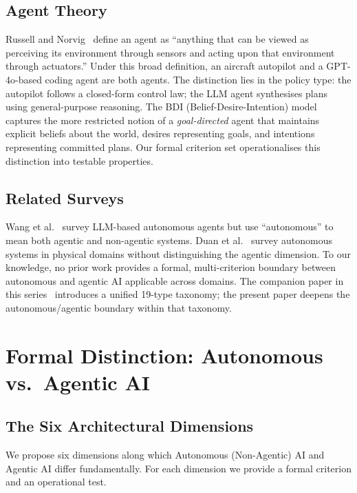 \documentclass[12pt, a4paper]{article}
\begin{document}
\subsection{Agent Theory}
Russell and Norvig~\citep{russell2021artificial} define an agent as ``anything that can be viewed as perceiving its environment through sensors and acting upon that environment through actuators.'' Under this broad definition, an aircraft autopilot and a GPT-4o-based coding agent are both agents. The distinction lies in the policy type: the autopilot follows a closed-form control law; the LLM agent synthesises plans using general-purpose reasoning. The BDI (Belief-Desire-Intention) model~\citep{rao1995bdi} captures the more restricted notion of a \emph{goal-directed} agent that maintains explicit beliefs about the world, desires representing goals, and intentions representing committed plans. Our formal criterion set operationalises this distinction into testable properties.

\subsection{Related Surveys}
Wang et al.~\citep{wang2024survey} survey LLM-based autonomous agents but use ``autonomous'' to mean both agentic and non-agentic systems. Duan et al.~\citep{duan2022survey} survey autonomous systems in physical domains without distinguishing the agentic dimension. To our knowledge, no prior work provides a formal, multi-criterion boundary between autonomous and agentic AI applicable across domains. The companion paper in this series~\citep{mahdi2026taxonomy} introduces a unified 19-type taxonomy; the present paper deepens the autonomous/agentic boundary within that taxonomy.

\section{Formal Distinction: Autonomous vs.\ Agentic AI}\label{sec:distinction}

\subsection{The Six Architectural Dimensions}

We propose six dimensions along which Autonomous (Non-Agentic) AI and Agentic AI differ fundamentally. For each dimension we provide a formal criterion and an operational test.
\end{document}
